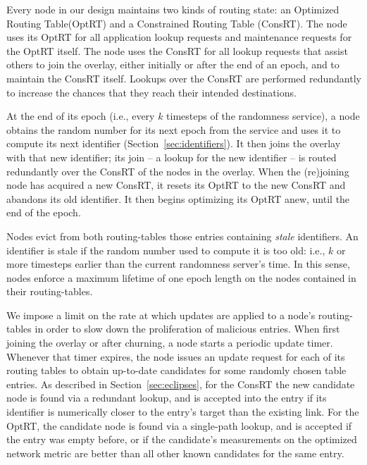 \documentclass[10pt,twocolumn]{article}
\newcommand{\PRT}{OptRT\xspace}
\newcommand{\fullPRT}{Optimized Routing Table\xspace}
\newcommand{\CRT}{ConsRT\xspace}
\newcommand{\fullCRT}{Constrained Routing Table\xspace}
\begin{document}
\label{sec:churn}

Every node in our design maintains 
two kinds of routing state: an \fullPRT (\PRT) and a \fullCRT
(\CRT). The node uses its \PRT for all application lookup requests and
maintenance requests for the \PRT itself.  The node uses
the \CRT for all lookup requests that assist others to join the overlay,
either initially or after the end of an epoch, and to maintain the \CRT
itself. Lookups over the \CRT are performed redundantly to increase the chances that they
reach their intended destinations.

At the end of its epoch (i.e., every $k$ timesteps of the randomness
service), a node obtains the random number for its next epoch from the
service and uses it to compute its next identifier (Section~\ref{sec:identifiers}).  It then joins the overlay with that new
identifier; its join -- a lookup for the new identifier --
is routed redundantly over the \CRT of the nodes in the overlay.  When
the (re)joining node has acquired a new \CRT, 
it resets its \PRT to the new \CRT and abandons its old identifier.
It then begins optimizing its \PRT anew, until the end of the epoch.

Nodes evict from both routing-tables those entries containing \emph{stale}
identifiers.  An identifier is stale if the random number used to
compute it is too old: i.e.,
$k$ or more timesteps earlier than the current randomness server's
time.  In this sense, nodes enforce a maximum lifetime of one epoch
length
on the nodes contained in their routing-tables.



\label{sec:rateLimitation}

We impose a limit on the rate at which updates are applied to a node's
routing-tables in order to slow down the proliferation of malicious
entries.
When first joining the overlay or after
churning, a node starts a periodic update timer.  Whenever that timer
expires, the node issues an update request for each of its routing
tables to obtain up-to-date candidates for some randomly chosen table
entries.  
As described in Section~\ref{sec:eclipses}, for the \CRT the new candidate
node is found via a redundant lookup, and
is accepted into the entry if its identifier is numerically closer to the
entry's target than the existing link.
For the \PRT, the candidate node is found via a single-path lookup, and is
accepted if the entry was empty before, or if the candidate's
measurements on the
optimized network metric are better than all other known candidates for
the same entry.
\end{document}
